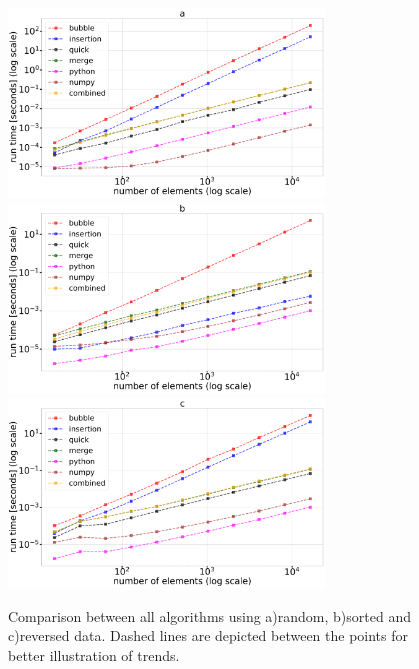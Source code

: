 \documentclass[sigconf, nonacm, natbib, screen, balance=False]{acmart}
\begin{document}
\begin{figure}
  \centering
  \includegraphics[width=84mm]{../figures/all_sorts_random_logscale.pdf}
  \includegraphics[width=84mm]{../figures/all_sorts_sorted_logscale.pdf}
  \includegraphics[width=84mm]{../figures/all_sorts_reverse_logscale.pdf}
  \caption{Comparison between all algorithms using a)random, b)sorted and c)reversed data. Dashed lines are depicted between the points for better illustration of trends.}
  \label{fig:fig_all}
\end{figure}
\end{document}
